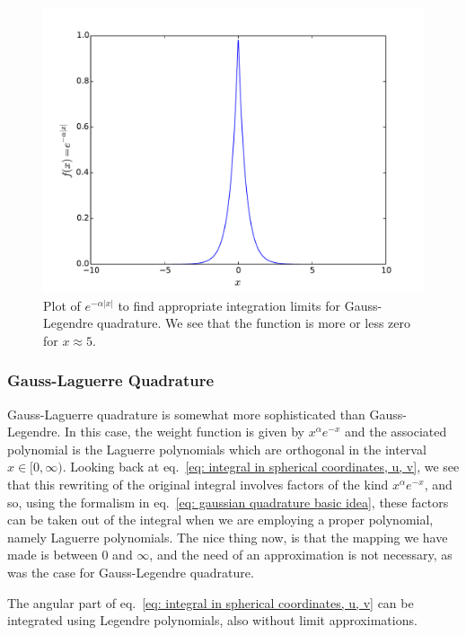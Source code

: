 \documentclass[twoside, 11pt]{article}
\begin{document}
			\begin{figure}
				\centering
				\includegraphics[scale=0.7, clip=true, trim= 0 0 0 0]{FYS3150-project-3-plot-taska-limits.pdf}
				\caption{Plot of $e^{-\alpha |x|}$ to find appropriate integration limits for Gauss-Legendre quadrature. We see that the function is more or less zero for $x\approx 5$.}
				\label{fig: integration limits Gauss-Legendre}
			\end{figure}
		
		
		\subsubsection{Gauss-Laguerre Quadrature}
			Gauss-Laguerre quadrature is somewhat more sophisticated than Gauss-Legendre. In this case, the weight function is given by $x^\alpha e^{-x}$ and the associated polynomial is the Laguerre polynomials which are orthogonal in the interval $x\in [0, \infty)$. Looking back at eq.~\eqref{eq: integral in spherical coordinates, u, v}, we see that this rewriting of the original integral involves factors of the kind $x^\alpha e^{-x}$, and so, using the formalism in eq.~\eqref{eq: gaussian quadrature basic idea}, these factors can be taken out of the integral when we are employing a proper polynomial, namely Laguerre polynomials. The nice thing now, is that the mapping we have made is between 0 and $\infty$, and the need of an approximation is not necessary, as was the case for Gauss-Legendre quadrature.
			
			The angular part of eq.~\eqref{eq: integral in spherical coordinates, u, v} can be integrated using Legendre polynomials, also without limit approximations. 
			
\end{document}
